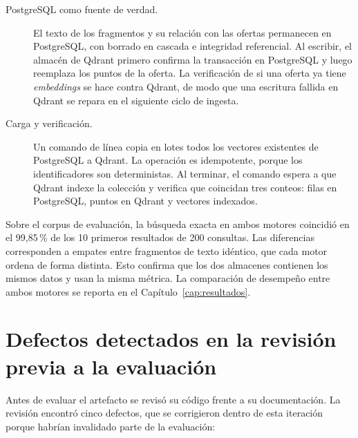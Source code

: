 \begin{description}
    \item[PostgreSQL como fuente de verdad.] El texto de los fragmentos y su relación con las ofertas permanecen en PostgreSQL, con borrado en cascada e integridad referencial. Al escribir, el almacén de Qdrant primero confirma la transacción en PostgreSQL y luego reemplaza los puntos de la oferta. La verificación de si una oferta ya tiene \textit{embeddings} se hace contra Qdrant, de modo que una escritura fallida en Qdrant se repara en el siguiente ciclo de ingesta.
    \item[Carga y verificación.] Un comando de línea copia en lotes todos los vectores existentes de PostgreSQL a Qdrant. La operación es idempotente, porque los identificadores son deterministas. Al terminar, el comando espera a que Qdrant indexe la colección y verifica que coincidan tres conteos: filas en PostgreSQL, puntos en Qdrant y vectores indexados.
\end{description}

Sobre el corpus de evaluación, la búsqueda exacta en ambos motores coincidió en el 99,85\,\% de los 10 primeros resultados de 200 consultas. Las diferencias corresponden a empates entre fragmentos de texto idéntico, que cada motor ordena de forma distinta. Esto confirma que los dos almacenes contienen los mismos datos y usan la misma métrica. La comparación de desempeño entre ambos motores se reporta en el Capítulo~\ref{cap:resultados}.

\section{Defectos detectados en la revisión previa a la evaluación}
\label{sec:art-defectos}

Antes de evaluar el artefacto se revisó su código frente a su documentación. La revisión encontró cinco defectos, que se corrigieron dentro de esta iteración porque habrían invalidado parte de la evaluación:

